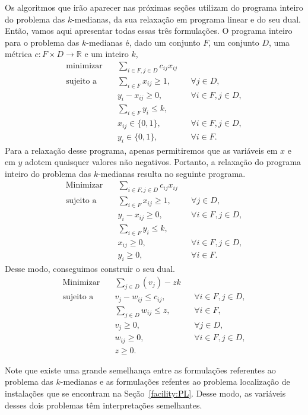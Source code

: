 Os algoritmos que irão aparecer nas próximas seções utilizam do programa inteiro do problema das $k$-medianas, da sua relaxação em programa linear e do seu dual. Então, vamos aqui apresentar todas essas três formulações. O programa inteiro para o problema das $k$-medianas é, dado um conjunto $F$, um conjunto $D$, uma métrica $c : F\times D \rightarrow \mathbb{R}$ e um inteiro $k$,
\begin{align*}
\text{minimizar} \quad & \sum_{i \in F, j \in D} c_{ij}x_{ij} \\
\text{sujeito a} \quad & \sum_{i \in F} x_{ij} \geq 1, &&\forall j \in D, \\
                       & y_i - x_{ij} \geq 0, &&\forall i \in F, j \in D, \\
                       & \sum_{i \in F} y_i \leq k, \\
                       & x_{ij} \in \{0,1\}, && \forall i \in F,j \in D, \\
                       & y_i \in \{0,1\}, &&\forall i \in F. 
\end{align*}
Para a relaxação desse programa, apenas permitiremos que as variáveis em $x$ e em $y$ adotem quaisquer valores não negativos. Portanto, a relaxação do programa inteiro do problema das $k$-medianas resulta no seguinte programa.
\begin{align}
    \text{Minimizar} \quad & \sum_{i \in F, j \in D} c_{ij}x_{ij} \nonumber \\
    \text{sujeito a} \quad & \sum_{i \in F} x_{ij} \geq 1, &&\forall j \in D, \nonumber\\
                           & y_i - x_{ij} \geq 0, &&\forall i \in F, j \in D, \nonumber \\
                           & \sum_{i \in F} y_i \leq k, \\
                           & x_{ij} \geq 0, && \forall i \in F,j \in D, \nonumber \\
                           & y_i \geq 0, &&\forall i \in F. \nonumber 
\end{align}
Desse modo, conseguimos construir o seu dual.
\begin{align*}
    \text{Minimizar} \quad & \sum_{j \in D} (v_j) - zk \\
    \text{sujeito a} \quad & v_j - w_{ij} \leq c_{ij}, &&\forall i \in F, j\in D, \\
                           & \sum_{j\in D} w_{ij} \leq z, &&\forall i \in F, \\
                           & v_j \geq 0, &&\forall j\in D, \\
                           & w_{ij} \geq 0, && \forall i \in F,j \in D, \\
                           & z \geq 0. 
\end{align*}

Note que existe uma grande semelhança entre as formulações referentes ao problema das $k$-medianas e as formulações refentes ao problema localização de instalações que se encontram na Seção~\ref{facility:PL}. Desse modo, as variáveis desses dois problemas têm interpretações semelhantes.